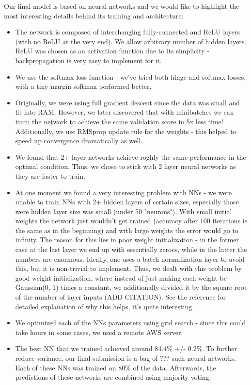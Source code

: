 \documentclass[10pt,conference,compsocconf]{IEEEtran}
\begin{document}
Our final model is based on neural networks and we would like to highlight the most interesting details behind its training and architecture:
\begin{itemize}
\item The network is composed of interchanging fully-connected and ReLU layers (with no ReLU at the very end). We allow arbitrary number of hidden layers. ReLU was chosen as an activation function due to its simplicity - backpropagation is very easy to implement for it.
\item We use the softmax loss function - we've tried both hinge and softmax losses, with a tiny margin softmax performed better.
\item Originally, we were using full gradient descent since the data was small and fit into RAM. However, we later discovered that with minibatches we can train the network to achieve the same validation score in 5x less time! Additionally, we use RMSprop update rule for the weights - this helped to speed up convergence dramatically as well.
\item We found that 2+ layer networks achieve roghly the same performance in the optimal condition. Thus, we chose to stick with 2 layer neural networks as they are faster to train.
\item At one moment we found a very interesting problem with NNs - we were unable to train NNs with 2+ hidden layers of certain sizes, especially those were hidden layer size was small (under 50 "neurons"). With small initial weights the network just wouldn't get trained (accuracy after 100 iterations is the same as in the beginning) and with large weights the error would go to infinity. The reason for this lies in poor weight initialization - in the former case at the last layer we end up with essentially zeroes, while in the latter the numbers are enormous. Ideally, one uses a batch-normalization layer to avoid this, but it is non-trivial to implement. Thus, we dealt with this problem by good weight initialization, where instead of just making each weight be Gaussian(0, 1) times a constant, we additionally divided it by the square root of the number of layer inputs (ADD CITATION). See the reference for detailed explanation of why this helps, it's quite interesting.
\item We optimized each of the NNs parameters using grid search - since this could take hours in some cases, we used a remote AWS server.
\item The best NN that we trained achieved around 84.4\% +/- 0.2\%. To further reduce variance, our final submission is a bag of ??? such neural networks. Each of these NNs was trained on 80\% of the data. Afterwards, the predictions of these networks are combined using majority voting.
\end{itemize}
\end{document}
